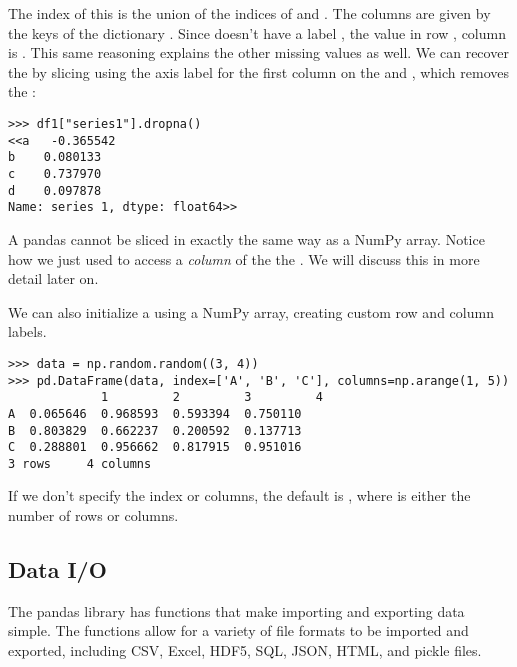 The index of this  is the union of the indices of   and  .
The columns are given by the keys of the dictionary .
Since  doesn't have a label , the value in row , column  is .
This same reasoning explains the other missing values as well.
We can recover the   by slicing using the axis label for the first column on the  and , which removes the :
 \begin{lstlisting}
>>> df1["series1"].dropna()
<<a   -0.365542
b    0.080133
c    0.737970
d    0.097878
Name: series 1, dtype: float64>>
\end{lstlisting}

\begin{warn}
A pandas  cannot be sliced in exactly the same way as a NumPy array.
Notice how we just used  to access a \emph{column} of the
the  .
We will discuss this in more detail later on.
\end{warn}

We can also initialize a  using a NumPy array, creating custom
row and column labels.

\begin{lstlisting}
>>> data = np.random.random((3, 4))
>>> pd.DataFrame(data, index=['A', 'B', 'C'], columns=np.arange(1, 5))
             1         2         3         4
A  0.065646  0.968593  0.593394  0.750110
B  0.803829  0.662237  0.200592  0.137713
C  0.288801  0.956662  0.817915  0.951016
3 rows     4 columns
\end{lstlisting}

If we don't specify the index or columns, the default is
, where  is either the number of rows or columns.

\subsection*{Data I/O}

The pandas library has functions that make importing and exporting data simple.
The functions allow for a variety of file formats to be imported and exported, including CSV, Excel, HDF5, SQL, JSON, HTML, and pickle files.

